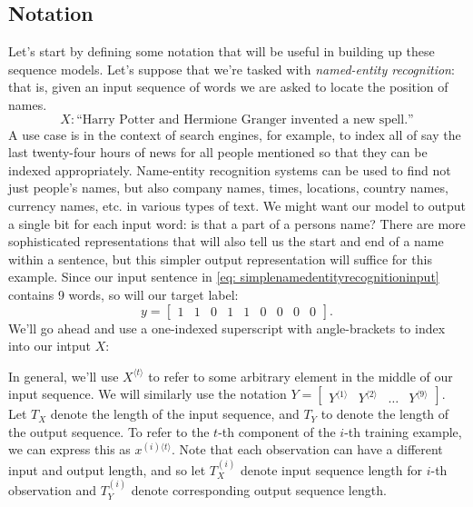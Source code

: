 \documentclass[12pt]{article}
\begin{document}
\subsection{Notation} Let's start by defining some notation that will be useful in building up these sequence models. Let's suppose that we're tasked with \emph{named-entity recognition}: that is, given an input sequence of words we are asked to locate the position of names.
\begin{equation}
\label{eq: simplenamedentityrecognitioninput}
X: \textrm{``Harry Potter and Hermione Granger invented a new spell.''}
\end{equation}
A use case is in the context of search engines, for example, to index all of say the last twenty-four hours of news for all people mentioned so that they can be indexed appropriately. Name-entity recognition systems can be used to find not just people's names, but also company names, times, locations, country names, currency names, etc. in various types of text. We might want our model to output a single bit for each input word: is that a part of a persons name? There are more sophisticated representations that will also tell us the start and end of a name within a sentence, but this simpler output representation will suffice for this example. Since our input sentence in \ref{eq: simplenamedentityrecognitioninput} contains 9 words, so will our target label:
\[
y = 
\begin{bmatrix} 1 & 1 & 0 & 1 & 1 & 0 & 0 & 0 & 0 \end{bmatrix}.
\]
We'll go ahead and use a one-indexed superscript with angle-brackets to index into our intput $X$:
\begin{figure}[h]
  \centering
\end{figure}
In general, we'll use $X^{\langle t \rangle}$ to refer to some arbitrary element in the middle of our input sequence. We will similarly use the notation
$Y = \begin{bmatrix} Y^{\langle 1 \rangle} & Y^{\langle 2 \rangle} & \ldots &   Y^{\langle 9 \rangle} \end{bmatrix}$.
Let $T_X$ denote the length of the input sequence, and $T_Y$ to denote the length of the output sequence. To refer to the $t$-th component of the $i$-th training example, we can express this as $x^{(i)\langle t \rangle}$. Note that each observation can have a different input and output length, and so let $T_X^{(i)}$ denote input sequence length for $i$-th observation and $T_Y^{(i)}$ denote corresponding output sequence length.
\end{document}
